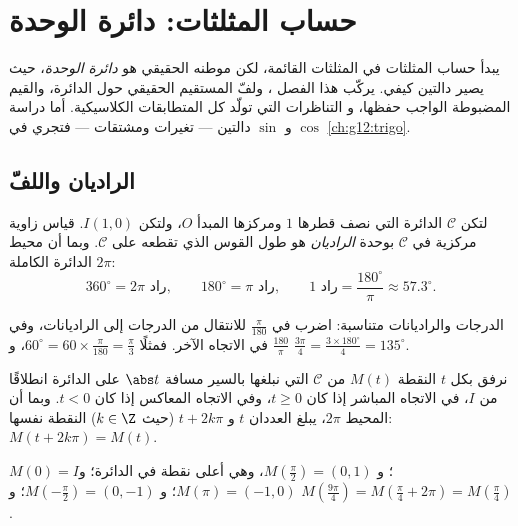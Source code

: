 \chapter{حساب المثلثات: دائرة الوحدة}\label{ch:g11:trigo}

يبدأ حساب المثلثات في المثلثات القائمة، لكن موطنه الحقيقي هو
\emph{دائرة الوحدة}، حيث يصير   دالتين  كيفي. يركّب هذا الفصل ، ولفّ المستقيم
الحقيقي حول الدائرة، والقيم المضبوطة الواجب حفظها، و
التناظرات التي تولّد كل المتطابقات الكلاسيكية. أما دراسة
$\cos$ و $\sin$ دالتين --- تغيرات ومشتقات --- فتجري
في \cref{ch:g12:trigo}.

\section{الراديان واللفّ}

\begin{definition}[الراديان]\label{def:g11:trigo:radian}
لتكن $\mathcal C$ الدائرة التي نصف قطرها $1$ ومركزها المبدأ $O$،
ولتكن $I(1, 0)$. قياس زاوية مركزية في $\mathcal C$ بوحدة \emph{الراديان}
هو طول القوس الذي تقطعه على $\mathcal C$.
وبما أن محيط الدائرة الكاملة $2\pi$:
\[
360^\circ = 2\pi \text{ راد},
\qquad
180^\circ = \pi \text{ راد},
\qquad
1 \text{ راد} = \frac{180^\circ}{\pi} \approx 57.3^\circ .
\]
\end{definition}

\begin{method}[التحويل]\label{met:g11:trigo:convert}
الدرجات والراديانات متناسبة: اضرب في $\frac{\pi}{180}$ للانتقال
من الدرجات إلى الراديانات، وفي $\frac{180}{\pi}$ في الاتجاه الآخر. فمثلًا
$60^\circ = 60 \times \frac{\pi}{180} = \frac{\pi}{3}$، و
$\frac{3\pi}{4} = \frac{3 \times 180^\circ}{4} = 135^\circ$.
\end{method}

\begin{definition}\label{def:g11:trigo:winding}
نرفق بكل  $t$ النقطة $M(t)$ من $\mathcal C$
التي نبلغها بالسير مسافة $\abs t$ على الدائرة انطلاقًا من $I$،
في الاتجاه المباشر إذا كان $t \geq 0$، وفي الاتجاه المعاكس إذا كان $t < 0$. وبما أن
المحيط $2\pi$، يبلغ العددان $t$ و $t + 2k\pi$ (حيث $k \in \Z$)
النقطة نفسها: $M(t + 2k\pi) = M(t)$.
\end{definition}

\begin{example}
$M(0) = I$؛ و $M\!\left(\frac{\pi}{2}\right) = (0, 1)$، وهي أعلى نقطة في
الدائرة؛ و $M(\pi) = (-1, 0)$؛ و $M\!\left(-\frac{\pi}{2}\right) = (0, -1)$؛
و $M\!\left(\frac{9\pi}{4}\right) = M\!\left(\frac{\pi}{4} +
2\pi\right) = M\!\left(\frac{\pi}{4}\right)$.
\end{example}

